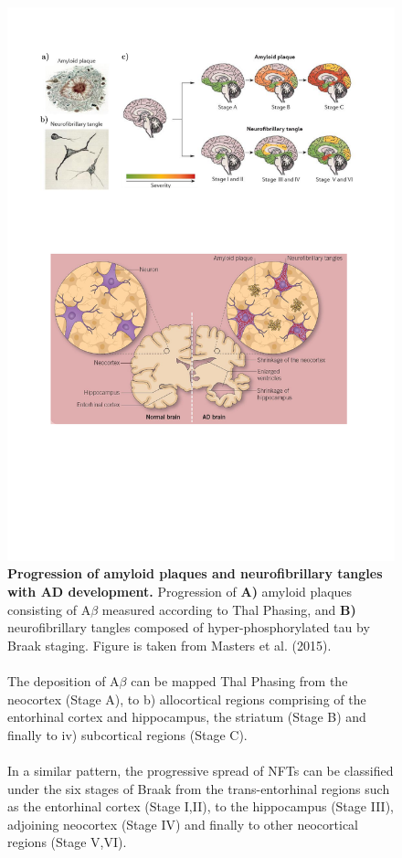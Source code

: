 \begin{figure}[!htp]
	\centering
	\includegraphics[page=1,trim={0 19cm 0cm 0cm},clip, scale = 0.8]{Figures/Introduction_Figures.pdf}
	\captionsetup{width=0.95\textwidth,singlelinecheck=off}
	\caption[Progression of amyloid plaques and neurofibrillary tangles with AD development]%
	{\textbf{Progression of amyloid plaques and neurofibrillary tangles with AD development.} Progression of \textbf{A)} amyloid plaques consisting of A$\beta$ measured according to Thal Phasing\cite{DR2002}, and \textbf{B)} neurofibrillary tangles composed of hyper-phosphorylated tau by Braak staging\cite{H1991}. Figure is taken from Masters et al. (2015)\cite{Masters2015}. 
		\\
		\\ 
		The deposition of A$\beta$ can be mapped Thal Phasing from the neocortex (Stage A), to b) allocortical regions comprising of the entorhinal cortex and hippocampus, the striatum (Stage B) and finally to iv) subcortical regions (Stage C)\cite{DR2002}. 
		\\
		\\
		In a similar pattern, the progressive spread of NFTs can be classified under the six stages of Braak from the trans-entorhinal regions such as the entorhinal cortex (Stage I,II), to the hippocampus (Stage III), adjoining neocortex (Stage IV) and finally to other neocortical regions (Stage V,VI)\cite{H1991}. 	
	}
	\label{fig:AD_development}
\end{figure}

